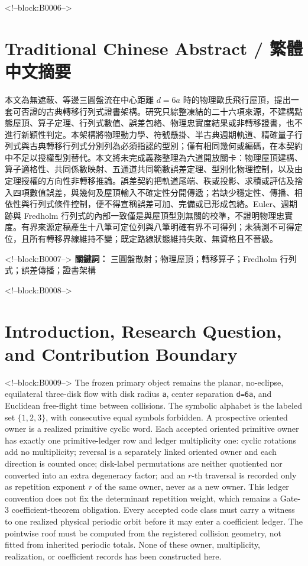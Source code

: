 \documentclass[11pt,a4paper]{article}
\begin{document}
<!--block:B0006-->
\begin{otherlanguage}{chinese-traditional}
\section*{Traditional Chinese Abstract / 繁體中文摘要}
本文為無遮蔽、等邊三圓盤流在中心距離 \(d=6a\) 時的物理歐氏飛行屋頂，提出一套可否證的古典轉移行列式證書架構。研究只綜整凍結的二十六項來源，不建構點態屋頂、算子定理、行列式數值、誤差包絡、物理忠實度結果或非轉移證書，也不進行新穎性判定。本架構將物理動力學、符號懸掛、半古典週期軌道、精確量子行列式與古典轉移行列式分別列為必須指認的型別；僅有相同幾何或編碼，在本契約中不足以授權型別替代。本文將未完成義務整理為六道開放關卡：物理屋頂建構、算子適格性、共同係數映射、五通道共同範數誤差定理、型別化物理控制，以及由定理授權的方向性非轉移推論。誤差契約把軌道尾端、秩或投影、求積或評估及捨入四項數值誤差，與幾何及屋頂輸入不確定性分開傳遞；若缺少穩定性、傳播、相依性與行列式條件控制，便不得宣稱誤差可加、完備或已形成包絡。Euler、週期跡與 Fredholm 行列式的內部一致僅是與屋頂型別無關的校準，不證明物理忠實度。有界來源定稿產生十八筆可定位列與八筆明確有界不可得列；未猜測不可得定位，且所有轉移界線維持不變；既定路線狀態維持失敗、無資格且不晉級。

<!--block:B0007-->
\noindent\textbf{關鍵詞：} 三圓盤散射；物理屋頂；轉移算子；Fredholm 行列式；誤差傳播；證書架構
\end{otherlanguage}

<!--block:B0008-->
\section{Introduction, Research Question, and Contribution Boundary}

<!--block:B0009-->
The frozen primary object remains the planar, no-eclipse, equilateral three-disk flow with disk radius \texttt{a}, center separation \texttt{d=6a}, and Euclidean free-flight time between collisions. The symbolic alphabet is the labeled set \(\{1,2,3\}\), with consecutive equal symbols forbidden. A prospective oriented owner is a realized primitive cyclic word. Each accepted oriented primitive owner has exactly one primitive-ledger row and ledger multiplicity one: cyclic rotations add no multiplicity; reversal is a separately linked oriented owner and each direction is counted once; disk-label permutations are neither quotiented nor converted into an extra degeneracy factor; and an \(r\)-th traversal is recorded only as repetition exponent \(r\) of the same owner, never as a new owner. This ledger convention does not fix the determinant repetition weight, which remains a Gate-3 coefficient-theorem obligation. Every accepted code class must carry a witness to one realized physical periodic orbit before it may enter a coefficient ledger. The pointwise roof must be computed from the registered collision geometry, not fitted from inherited periodic totals. None of these owner, multiplicity, realization, or coefficient records has been constructed here.
\end{document}
